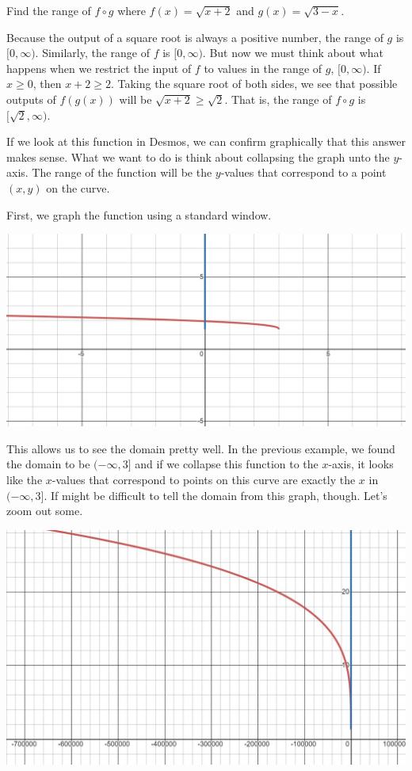 \documentclass{ximera}
\begin{document}
\begin{example}
Find the range of $f \circ g$ where $f(x)=\sqrt{x+2}$ and $g(x)=\sqrt{3-x}$.

\begin{explanation}
Because the output of a square root is always a positive number, the range of $g$ is $[0,\infty)$.  Similarly, the range of $f$ is $[0,\infty)$.  But now we must think about what happens when we restrict the input of $f$ to values in the range of $g$, $[0,\infty)$.  If $x \geq 0$, then $x+2 \geq 2$.  Taking the square root of both sides, we see that possible outputs of $f(g(x))$ will be $\sqrt{x+2} \geq \sqrt{2}$.  That is, the range of $f \circ g$ is $[\sqrt{2},\infty)$.

If we look at this function in Desmos, we can confirm graphically that this answer makes sense.  What we want to do is think about collapsing the graph unto the $y$-axis.  The range of the function will be the $y$-values that correspond to a point $(x,y)$ on the curve.  

First, we graph the function using a standard window.
\begin{image}
\includegraphics{composite-range.jpg}
\end{image}

This allows us to see the domain pretty well.  In the previous example, we found the domain to be $(- \infty,3]$ and if we collapse this function to the $x$-axis, it looks like the $x$-values that correspond to points on this curve are exactly the $x$ in $(- \infty,3]$.  If might be difficult to tell the domain from this graph, though.  Let's zoom out some.

\begin{image}
\includegraphics{composite-range-zoomed-out.jpg}
\end{image}


\end{explanation}
\end{example}
\end{document}
